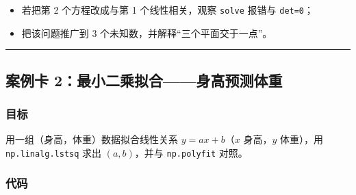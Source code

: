 \begin{itemize}
\tightlist
\item
  若把第 2 个方程改成与第 1 个线性相关，观察 \texttt{solve} 报错与
  \texttt{det=0}；
\item
  把该问题推广到 3 个未知数，并解释``三个平面交于一点''。
\end{itemize}

\begin{center}\rule{0.5\linewidth}{0.5pt}\end{center}

\subsection{案例卡
2：最小二乘拟合------身高预测体重}\label{ux6848ux4f8bux5361-2ux6700ux5c0fux4e8cux4e58ux62dfux5408ux8eabux9ad8ux9884ux6d4bux4f53ux91cd}

\subsubsection{目标}\label{ux76eeux6807-7}

用一组（身高，体重）数据拟合线性关系 \(y = a x + b\)（\(x\) 身高，\(y\)
体重），用 \texttt{np.linalg.lstsq} 求出 \((a, b)\)，并与
\texttt{np.polyfit} 对照。

\subsubsection{代码}\label{ux4ee3ux7801-7}

